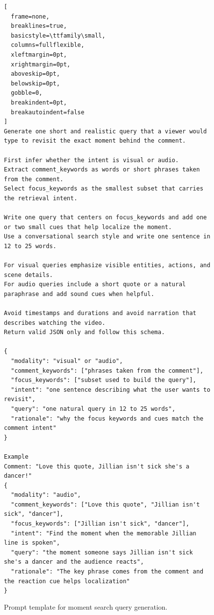 \begin{figure}[t]
\centering
\begin{tcolorbox}[
  colback=blue!5!white,
  colframe=blue!75!black,
  width=\linewidth,
  arc=1mm,
  boxrule=0.8pt,
  title=\textbf{Moment Search Query Generation},
  colbacktitle=blue!75!black,
  coltitle=white,
  fonttitle=\bfseries\sffamily,
  halign title=center,
  top=4mm,
  bottom=4mm,
  left=3mm,
  right=3mm
]
\begin{lstlisting}[
  frame=none,
  breaklines=true,
  basicstyle=\ttfamily\small,
  columns=fullflexible,
  xleftmargin=0pt,
  xrightmargin=0pt,
  aboveskip=0pt,
  belowskip=0pt,
  gobble=0,
  breakindent=0pt,
  breakautoindent=false
]
Generate one short and realistic query that a viewer would type to revisit the exact moment behind the comment.

First infer whether the intent is visual or audio.
Extract comment_keywords as words or short phrases taken from the comment.
Select focus_keywords as the smallest subset that carries the retrieval intent.

Write one query that centers on focus_keywords and add one or two small cues that help localize the moment.
Use a conversational search style and write one sentence in 12 to 25 words.

For visual queries emphasize visible entities, actions, and scene details.
For audio queries include a short quote or a natural paraphrase and add sound cues when helpful.

Avoid timestamps and durations and avoid narration that describes watching the video.
Return valid JSON only and follow this schema.

{
  "modality": "visual" or "audio",
  "comment_keywords": ["phrases taken from the comment"],
  "focus_keywords": ["subset used to build the query"],
  "intent": "one sentence describing what the user wants to revisit",
  "query": "one natural query in 12 to 25 words",
  "rationale": "why the focus keywords and cues match the comment intent"
}

Example
Comment: "Love this quote, Jillian isn't sick she's a dancer!"
{
  "modality": "audio",
  "comment_keywords": ["Love this quote", "Jillian isn't sick", "dancer"],
  "focus_keywords": ["Jillian isn't sick", "dancer"],
  "intent": "Find the moment when the memorable Jillian line is spoken",
  "query": "the moment someone says Jillian isn't sick she's a dancer and the audience reacts",
  "rationale": "The key phrase comes from the comment and the reaction cue helps localization"
}
\end{lstlisting}
\end{tcolorbox}
\caption{Prompt template for moment search query generation.}
\label{fig:search_query_generation_prompt}
\end{figure}

